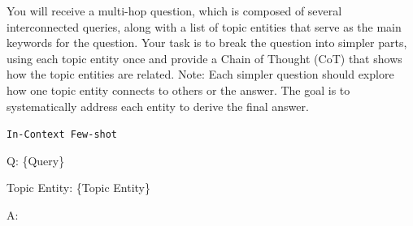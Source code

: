 \begin{center}
\begin{minipage}{0.7\columnwidth}
    \vspace{2mm}
        \centering
    \begin{tcolorbox}[title=Question Analysis Prompt Template] 
        \small
    You will receive a multi-hop question, which is composed of several interconnected queries, along with a list of topic entities that serve as the main keywords for the question. Your task is to break the question into simpler parts, using each topic entity once and provide a Chain of Thought (CoT) that shows how the topic entities are related. Note: Each simpler question should explore how one topic entity connects to others or the answer. The goal is to systematically address each entity to derive the final answer.
\vspace{5pt}
    
    \texttt{In-Context Few-shot}
\vspace{5pt}
    
    Q: \{Query\} 
    
    Topic Entity: \{Topic Entity\} 
    
    A: 
    \end{tcolorbox}
    \vspace{2mm}

\end{minipage}
\end{center}

